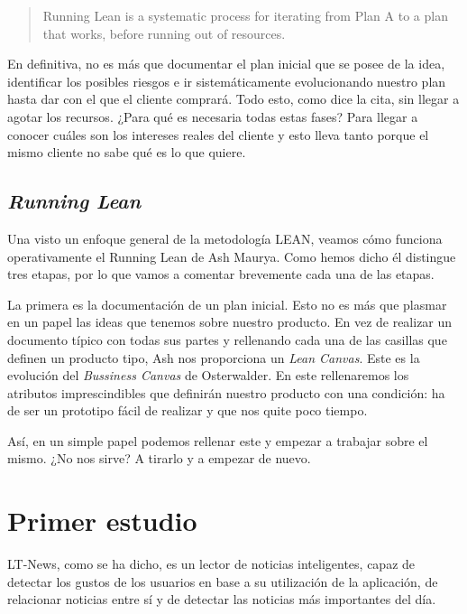 \begin{quote}
	\small Running Lean is a systematic process for iterating from Plan A to a plan that works, before running out of resources.
	\begin{flushright}
	\end{flushright}
\end{quote}

En definitiva, no es más que documentar el plan inicial que se posee de la idea, identificar los posibles riesgos e ir sistemáticamente evolucionando nuestro plan hasta dar con el que el cliente comprará. Todo esto, como dice la cita, sin llegar a agotar los recursos. ¿Para qué es necesaria todas estas fases? Para llegar a conocer cuáles son los intereses reales del cliente y esto lleva tanto porque el mismo cliente no sabe qué es lo que quiere.

\subsection{\textit{Running Lean}}

Una visto un enfoque general de la metodología LEAN, veamos cómo funciona operativamente el Running Lean de Ash Maurya. Como hemos dicho él distingue tres etapas, por lo que vamos a comentar brevemente cada una de las etapas.

La primera es la documentación de un plan inicial. Esto no es más que plasmar en un papel las ideas que tenemos sobre nuestro producto. En vez de realizar un documento típico con todas sus partes y rellenando cada una de las casillas que definen un producto tipo, Ash nos proporciona un \textit{Lean Canvas}. Este es la evolución del \textit{Bussiness Canvas} de Osterwalder. En este rellenaremos los atributos imprescindibles que definirán nuestro producto con una condición: ha de ser un prototipo fácil de realizar y que nos quite poco tiempo.

Así, en un simple papel podemos rellenar este y empezar a trabajar sobre el mismo. ¿No nos sirve? A tirarlo y a empezar de nuevo.



\section{Primer estudio}\label{sec:primer_estudio}

LT-News, como se ha dicho, es un lector de noticias inteligentes, capaz de detectar los gustos de los usuarios en base a su utilización de la aplicación, de relacionar noticias entre sí y de detectar las noticias más importantes del día.

